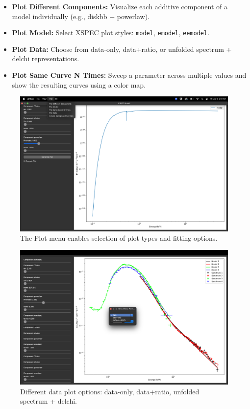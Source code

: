 \documentclass[11pt]{article}
\begin{document}
\begin{itemize}
    \item \textbf{Plot Different Components:} Visualize each additive component of a model individually (e.g., diskbb + powerlaw).
    \item \textbf{Plot Model:} Select XSPEC plot styles: \texttt{model}, \texttt{emodel}, \texttt{eemodel}.
    \item \textbf{Plot Data:} Choose from data-only, data+ratio, or unfolded spectrum + delchi representations.
    \item \textbf{Plot Same Curve N Times:} Sweep a parameter across multiple values and show the resulting curves using a color map.
\end{itemize}

\begin{figure}[H]
    \centering
    \includegraphics[width=0.7\linewidth]{documentation_images/plot_menu.png}
    \caption{The Plot menu enables selection of plot types and fitting options.}
\end{figure}

\begin{figure}[H]
    \centering
    \includegraphics[width=0.7\linewidth]{documentation_images/plot_data-options.png}
    \caption{Different data plot options: data-only, data+ratio, unfolded spectrum + delchi.}
\end{figure}
\end{document}
